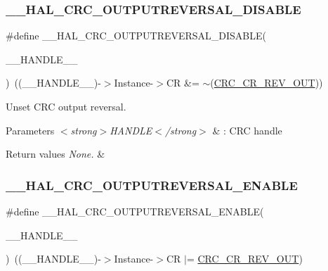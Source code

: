 \subsubsection{\texorpdfstring{\+\_\+\+\_\+\+H\+A\+L\+\_\+\+C\+R\+C\+\_\+\+O\+U\+T\+P\+U\+T\+R\+E\+V\+E\+R\+S\+A\+L\+\_\+\+D\+I\+S\+A\+B\+LE}{\_\_HAL\_CRC\_OUTPUTREVERSAL\_DISABLE}}
{\footnotesize\ttfamily \#define \+\_\+\+\_\+\+H\+A\+L\+\_\+\+C\+R\+C\+\_\+\+O\+U\+T\+P\+U\+T\+R\+E\+V\+E\+R\+S\+A\+L\+\_\+\+D\+I\+S\+A\+B\+LE(\begin{DoxyParamCaption}\item[{}]{\+\_\+\+\_\+\+H\+A\+N\+D\+L\+E\+\_\+\+\_\+ }\end{DoxyParamCaption})~((\+\_\+\+\_\+\+H\+A\+N\+D\+L\+E\+\_\+\+\_\+)-\/$>$Instance-\/$>$CR \&= $\sim$(\hyperlink{group___peripheral___registers___bits___definition_ga62d72fcad54fe50ab75d2895d6e155f7}{C\+R\+C\+\_\+\+C\+R\+\_\+\+R\+E\+V\+\_\+\+O\+UT}))}



Unset C\+RC output reversal. 


\begin{DoxyParams}{Parameters}
{\em $<$strong$>$\+H\+A\+N\+D\+L\+E$<$/strong$>$} & \+: C\+RC handle \\
\hline
\end{DoxyParams}

\begin{DoxyRetVals}{Return values}
{\em None.} & \\
\hline
\end{DoxyRetVals}
\mbox{\label{group___c_r_c_ex___exported___macros_ga260d1889690fbb69503e9c93340b554d}} 
\subsubsection{\texorpdfstring{\+\_\+\+\_\+\+H\+A\+L\+\_\+\+C\+R\+C\+\_\+\+O\+U\+T\+P\+U\+T\+R\+E\+V\+E\+R\+S\+A\+L\+\_\+\+E\+N\+A\+B\+LE}{\_\_HAL\_CRC\_OUTPUTREVERSAL\_ENABLE}}
{\footnotesize\ttfamily \#define \+\_\+\+\_\+\+H\+A\+L\+\_\+\+C\+R\+C\+\_\+\+O\+U\+T\+P\+U\+T\+R\+E\+V\+E\+R\+S\+A\+L\+\_\+\+E\+N\+A\+B\+LE(\begin{DoxyParamCaption}\item[{}]{\+\_\+\+\_\+\+H\+A\+N\+D\+L\+E\+\_\+\+\_\+ }\end{DoxyParamCaption})~((\+\_\+\+\_\+\+H\+A\+N\+D\+L\+E\+\_\+\+\_\+)-\/$>$Instance-\/$>$CR $\vert$= \hyperlink{group___peripheral___registers___bits___definition_ga62d72fcad54fe50ab75d2895d6e155f7}{C\+R\+C\+\_\+\+C\+R\+\_\+\+R\+E\+V\+\_\+\+O\+UT})}



